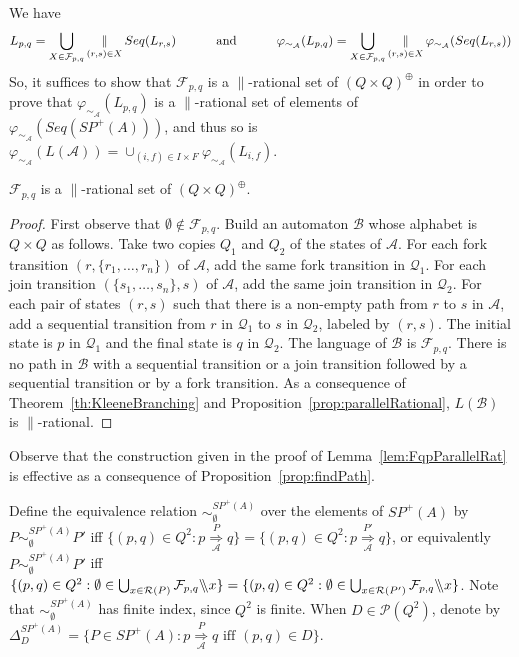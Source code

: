 \documentclass{CSML}
\newcommand{\quotientparallel}[2]{\ensuremath{#1\backslash\kern-3pt\backslash#2}}
\begin{document}
We have $$L_{p,q}=\mathop\bigcup_{X\in \mathcal{F}_{p,q}}\mathop\parallel_{(r,s)\in X} Seq(L_{r,s}) \hskip1cm \text{ and } \hskip1cm \varphi_{\sim_\mathcal{A}}(L_{p,q})=\mathop\bigcup_{X\in \mathcal{F}_{p,q}}\mathop\parallel_{(r,s)\in X} \varphi_{\sim_\mathcal{A}}(Seq(L_{r,s}))$$
So, it suffices to show that $\mathcal{F}_{p,q}$ is a $\parallel$-rational set of $(Q\times Q)^\oplus$ in order to prove that $\varphi_{\sim_\mathcal{A}}(L_{p,q})$ is a $\parallel$-rational set of elements of $\varphi_{\sim_\mathcal{A}}(Seq(SP^+(A)))$, and thus so is $\varphi_{\sim_\mathcal{A}}(L(\mathcal{A}))=\cup_{(i,f)\in I\times F}\varphi_{\sim_\mathcal{A}}(L_{i,f})$.

\begin{lem}
  \label{lem:FqpParallelRat}
  $\mathcal{F}_{p,q}$ is a $\parallel$-rational set of $(Q\times Q)^\oplus$.
\end{lem}

\begin{proof}
  First observe that $\emptyset\not\in\mathcal{F}_{p,q}$.
  Build an automaton $\mathcal{B}$ whose alphabet is $Q\times Q$ as follows.
  Take two copies $Q_1$ and $Q_2$ of the states of $\mathcal{A}$.
  For each fork transition $(r,\{r_1,\dots,r_n\})$ of $\mathcal{A}$, add the same fork transition in $\mathcal{Q}_1$.
  For each join transition $(\{s_1,\dots,s_n\},s)$ of $\mathcal{A}$, add the same join transition in $\mathcal{Q}_2$.
  For each pair of states $(r,s)$ such that there is a non-empty path from $r$ to $s$ in $\mathcal{A}$, add a sequential transition from $r$ in $\mathcal{Q}_1$ to $s$ in $\mathcal{Q}_2$, labeled by $(r,s)$.
  The initial state is $p$ in $\mathcal{Q}_1$ and the final state is $q$ in $\mathcal{Q}_2$.
  The language of $\mathcal{B}$ is $\mathcal{F}_{p,q}$.
  There is no path in $\mathcal{B}$ with a sequential transition or a join transition followed by a sequential transition or by a fork transition.
  As a consequence of Theorem~\ref{th:KleeneBranching} and Proposition~\ref{prop:parallelRational}, $L(\mathcal{B})$ is $\parallel$-rational.
\end{proof}

Observe that the construction given in the proof of Lemma~\ref{lem:FqpParallelRat} is effective as a consequence of Proposition~\ref{prop:findPath}.

Define the equivalence relation $\sim_\emptyset^{SP^+(A)}$ over the elements of $SP^+(A)$ by 
$P\sim_\emptyset^{SP^+(A)} P'$ iff 
$\{(p,q)\in Q^2: p \mathop{\Longrightarrow}\limits_{\mathcal{A}}^{P} q\} = \{(p,q)\in Q^2: p \mathop{\Longrightarrow}\limits_{\mathcal{A}}^{P'} q\}$, or equivalently
 $P\sim_\emptyset^{SP^+(A)} P'$ iff 
 $
 \{(p,q)\in Q^2 : \emptyset\in\mathop\bigcup_{x\in \mathcal{R}(P)}\quotientparallel{\mathcal{F}_{p,q}}{x}\}
 =
 \{(p,q)\in Q^2 : \emptyset\in\mathop\bigcup_{x\in \mathcal{R}(P')}\quotientparallel{\mathcal{F}_{p,q}}{x}\}
 $.
Note that $\sim_\emptyset^{SP^+(A)}$ has finite index, since $Q^2$ is finite.
When $D\in\mathcal{P}(Q^2)$, denote by  $\Delta_D^{SP^+(A)}=\{P\in SP^+(A) : p \mathop{\Longrightarrow}\limits_{\mathcal{A}}^{P} q\text{ iff }(p,q)\in D\}$.
\end{document}
